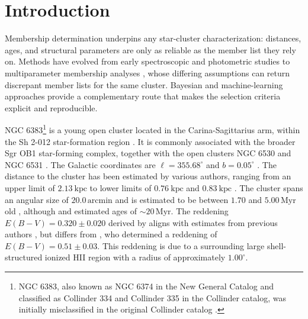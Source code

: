 \documentclass{aa}
\begin{document}


   \maketitle
\nolinenumbers

\section{Introduction}\label{S_intro}
Membership determination underpins any star-cluster characterization: distances, ages, and structural parameters are only as reliable as the member list they rely on. Methods have evolved from early spectroscopic and photometric studies \citep[e.g.,][]{1930LicOB..14..154T,1949ApJ...110..117S,1968ArA.....5....1L,1978MNRAS.182..607F} to multiparameter membership analyses \citep{1989MNRAS.236..263P,1991MNRAS.249...76B,2005AA...438.1163K,2007AA...462..157P,2018AA...610A..30A}, whose differing assumptions can return discrepant member lists for the same cluster. Bayesian and machine-learning approaches provide a complementary route that makes the selection criteria explicit and reproducible.

NGC 6383\footnote{NGC 6383, also known as NGC 6374 in the New General Catalog \citep{2008hsf2.book..497R} and classified as Collinder 334 and Collinder 335 in the Collinder catalog, was initially misclassified in the original Collinder catalog \citep{1931AnLun...2....1C}.} is a young open cluster located in the Carina-Sagittarius arm, within the Sh 2-012 star-formation region \citep{1959ApJS....4..257S}. It is commonly associated with the broader Sgr OB1 star-forming complex, together with the open clusters NGC 6530 and NGC 6531 \citep{2008hsf2.book..497R}. The Galactic coordinates are $\ell = 355.68^{\circ}$ and $b = 0.05^{\circ}$ \citep{2017A&A...600A.106C}. The distance to the cluster has been estimated by various authors, ranging from an upper limit of $2.13~\mathrm{kpc}$ \citep{1930LicOB..14..154T} to lower limits of $0.76~\mathrm{kpc}$ \citep{1949ApJ...110..117S} and $0.83~\mathrm{kpc}$ \citep{2018AA...610A..30A}. The cluster spans an angular size of $20.0\,\mathrm{arcmin}$ \citep{2013A&A...560A..76M} and is estimated to be between $1.70$ and $5.00\,\mathrm{Myr}$ old \citep{1978MNRAS.182..607F,1989MNRAS.236..263P,2005AA...438.1163K,2007AA...462..157P}, although \citet{1968ArA.....5....1L} and \citet{1991MNRAS.249...76B} estimated ages of $\sim20\,\mathrm{Myr}$. The reddening $E(B-V) = 0.320 \pm 0.020$ derived by \citet{2008hsf2.book..497R} aligns with estimates from previous authors \citep{1971AAS....4..241B,1978MNRAS.182..607F,1978MNRAS.184..661L,1985AA...151..391T,1989MNRAS.236..263P,1994RMxAA..29..141F,2007AA...462..157P}, but differs from \citet{2018AA...610A..30A}, who determined a reddening of $E(B-V) = 0.51 \pm 0.03$. This reddening is due to a surrounding large shell-structured ionized HII region with a radius of approximately $1.00^{\circ}$.
\end{document}
